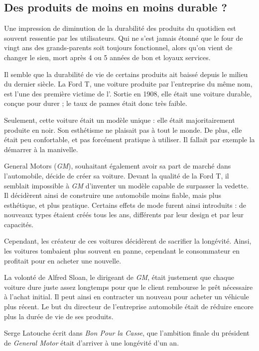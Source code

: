 \subsection{Des produits de moins en moins durable ?}

Une impression de diminution de la durabilité des produits du quotidien est souvent ressentie par les utilisateurs. Qui ne s'est jamais étonné que le four de vingt ans des grands-parents soit toujours fonctionnel, alors qu'on vient de changer le sien, mort après 4 ou 5 années de bon et loyaux services. 

Il semble que la durabilité de vie de certains produits ait baissé depuis le milieu du dernier siècle. 
\smallbreak
La Ford T, une voiture produite par l'entreprise du même nom, est l'une des première victime de l'\op. Sortie en 1908, elle était une voiture durable, conçue pour durer ; le taux de pannes était donc très faible.   

Seulement, cette voiture était un modèle unique : elle était majoritairement produite en noir. Son esthétisme ne plaisait pas à tout le monde. De plus, elle était peu confortable, et pas forcément pratique à utiliser. Il fallait par exemple la démarrer à la manivelle. 

General Motors (\textit{GM}), souhaitant également avoir sa part de marché dans l'automobile, décide de créer sa voiture. Devant la qualité de la Ford T, il semblait impossible à \textit{GM} d'inventer un modèle capable de surpasser la vedette. Il décidèrent ainsi de construire une automobile moins fiable, mais plus esthétique, et plus pratique. Certains effets de mode furent ainsi introduits : de nouveaux types étaient créés tous les ans, différents par leur design et par leur capacités.


Cependant, les créateur de ces voitures décidèrent de sacrifier la longévité. Ainsi, les voitures tombaient plus souvent en panne, cependant le consommateur en profitait pour en acheter une nouvelle.


La volonté de Alfred Sloan, le dirigeant de \textit{GM}, était justement que chaque voiture dure juste assez longtemps pour que le client rembourse le prêt nécessaire à l'achat initial.
Il peut ainsi en contracter un nouveau pour acheter un véhicule plus récent. Le but du directeur de l'entreprise automobile était de réduire encore plus la durée de vie de ses produits.

Serge Latouche écrit dans \textit{Bon Pour la Casse}\cite{bpc}, que l'ambition finale du président de \textit{General Motor} était d'arriver à une longévité d'un an.

